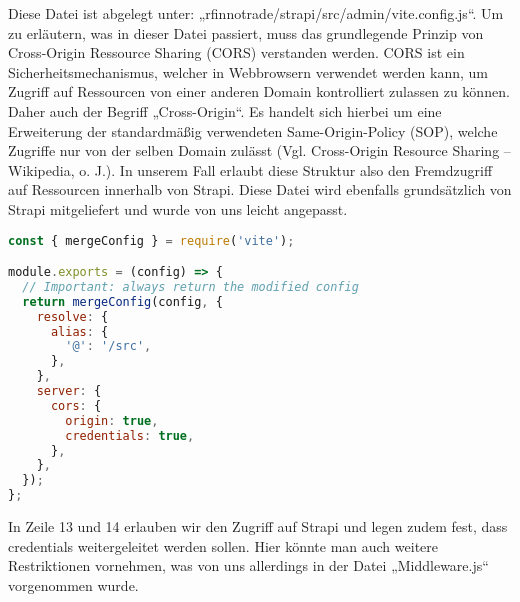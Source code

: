 Diese Datei ist abgelegt unter: „rfinnotrade/strapi/src/admin/vite.config.js“.
Um zu erläutern, was in dieser Datei passiert, muss das grundlegende Prinzip von Cross-Origin Ressource Sharing (CORS) verstanden werden. CORS ist ein Sicherheitsmechanismus, welcher in Webbrowsern verwendet werden kann, um Zugriff auf Ressourcen von einer anderen Domain kontrolliert zulassen zu können. Daher auch der Begriff „Cross-Origin“. Es handelt sich hierbei um eine Erweiterung der standardmäßig verwendeten Same-Origin-Policy (SOP), welche Zugriffe nur von der selben Domain zulässt (Vgl. Cross-Origin Resource Sharing – Wikipedia, o. J.). In unserem Fall erlaubt diese Struktur also den Fremdzugriff auf Ressourcen innerhalb von Strapi.
Diese Datei wird ebenfalls grundsätzlich von Strapi mitgeliefert und wurde von uns leicht angepasst.

\begin{lstlisting}[language=JavaScript, caption={Vite.config.js}, label={lst:viteconfigjs}]
const { mergeConfig } = require('vite');

module.exports = (config) => {
  // Important: always return the modified config
  return mergeConfig(config, {
    resolve: {
      alias: {
        '@': '/src',
      },
    },
    server: {
      cors: {
        origin: true,
        credentials: true,
      },
    },
  });
};
\end{lstlisting}

In Zeile 13 und 14 erlauben wir den Zugriff auf Strapi und legen zudem fest, dass credentials weitergeleitet werden sollen. Hier könnte man auch weitere Restriktionen vornehmen, was von uns allerdings in der Datei „Middleware.js“ vorgenommen wurde.